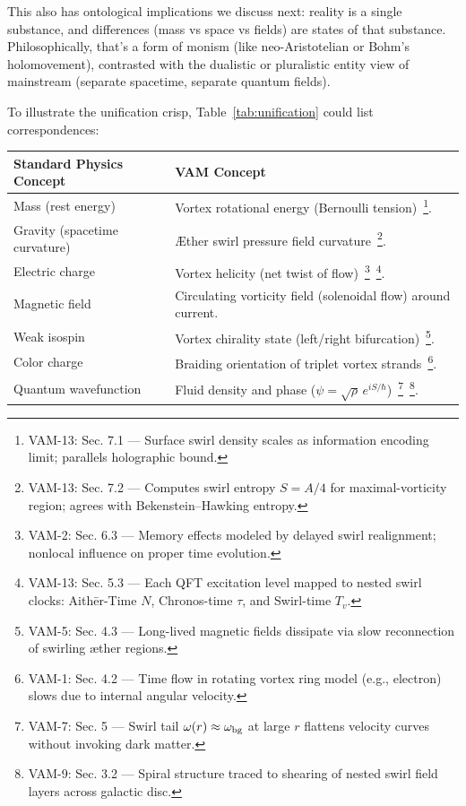 \documentclass[a4paper,12pt]{article}
\begin{document}
    This also has ontological implications we discuss next: reality is a single substance, and differences (mass vs space vs fields) are states of that substance. Philosophically, that’s a form of monism (like neo-Aristotelian or Bohm’s holomovement), contrasted with the dualistic or pluralistic entity view of mainstream (separate spacetime, separate quantum fields).

    To illustrate the unification crisp, Table~\ref{tab:unification} could list correspondences:
    \begin{table}[H]
        \centering
        \scriptsize
        \begin{tabular}{p{} p{}}
            \hline
            Standard Physics Concept & VAM Concept \\
            \hline
            Mass (rest energy) & Vortex rotational energy (Bernoulli tension)~\footnote{VAM-13: Sec. 7.1 — Surface swirl density scales as information encoding limit; parallels holographic bound.}. \\
            Gravity (spacetime curvature) & Æther swirl pressure field curvature~\footnote{VAM-13: Sec. 7.2 — Computes swirl entropy $S = A/4$ for maximal-vorticity region; agrees with Bekenstein–Hawking entropy.}. \\
            Electric charge & Vortex helicity (net twist of flow)~\footnote{VAM-2: Sec. 6.3 — Memory effects modeled by delayed swirl realignment; nonlocal influence on proper time evolution.}~\footnote{VAM-13: Sec. 5.3 — Each QFT excitation level mapped to nested swirl clocks: Aithēr-Time $N$, Chronos-time $\tau$, and Swirl-time $T_v$.}. \\
            Magnetic field & Circulating vorticity field (solenoidal flow) around current. \\
            Weak isospin & Vortex chirality state (left/right bifurcation)~\footnote{VAM-5: Sec. 4.3 — Long-lived magnetic fields dissipate via slow reconnection of swirling æther regions.}. \\
            Color charge & Braiding orientation of triplet vortex strands~\footnote{VAM-1: Sec. 4.2 — Time flow in rotating vortex ring model (e.g., electron) slows due to internal angular velocity.}. \\
            Quantum wavefunction & Fluid density and phase ($\psi = \sqrt{\rho}\,e^{iS/\hbar}$)~\footnote{VAM-7: Sec. 5 — Swirl tail $\omega(r) \approx \omega_{\rm bg}$ at large $r$ flattens velocity curves without invoking dark matter.}~\footnote{VAM-9: Sec. 3.2 — Spiral structure traced to shearing of nested swirl field layers across galactic disc.}. \\

\end{tabular}
\end{table}
\end{document}
